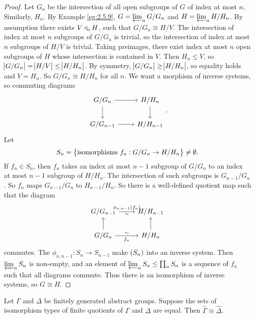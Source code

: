 \begin{proof}
Let $ G_n $ be the intersection of all open subgroups of $ G $ of index at most $ n $. Similarly, $ H_n $. By Example \ref{eg:2.5.9}, $ G = \varprojlim_n G / G_n $ and $ H = \varprojlim_n H / H_n $. By assumption there exists $ V \triangleleft_{\mathrm{o}} H $, such that $ G / G_n \cong H / V $. The intersection of index at most $ n $ subgroups of $ G / G_n $ is trivial, so the intersection of index at most $ n $ subgroups of $ H / V $ is trivial. Taking preimages, there exist index at most $ n $ open subgroups of $ H $ whose intersection is contained in $ V $. Then $ H_n \le V $, so $ \abs{G / G_n} = \abs{H / V} \le \abs{H / H_n} $. By symmetry, $ \abs{G / G_n} \ge \abs{H / H_n} $, so equality holds and $ V = H_n $. So $ G / G_n \cong H / H_n $ for all $ n $. We want a morphism of inverse systems, so commuting diagrams
$$
\begin{tikzcd}
G / G_n \arrow{r} \arrow{d} & H / H_n \arrow{d} \\
G / G_{n - 1} \arrow{r} & H / H_{n - 1}
\end{tikzcd}.
$$
Let
$$ S_n = \cbr{\text{isomorphisms} \ f_n : G / G_n \to H / H_n} \ne \emptyset. $$
If $ f_n \in S_n $, then $ f_n $ takes an index at most $ n - 1 $ subgroup of $ G / G_n $ to an index at most $ n - 1 $ subgroup of $ H / H_n $. The intersection of such subgroups is $ G_{n - 1} / G_n $. So $ f_n $ maps $ G_{n - 1} / G_n $ to $ H_{n - 1} / H_n $. So there is a well-defined quotient map such that the diagram
$$
\begin{tikzcd}
G / G_{n - 1} \arrow{r}{\phi_{n, n - 1}\br{f_n}}[swap]{\sim} & H / H_{n - 1} \\
G / G_n \arrow{r}{\sim}[swap]{f_n} \arrow{u} & H / H_n \arrow{u}
\end{tikzcd}
$$
commutes. The $ \phi_{n, n - 1} : S_n \to S_{n - 1} $ make $ \br{S_n} $ into an inverse system. Then $ \varprojlim_n S_n $ is non-empty, and an element of $ \varprojlim_n S_n \le \prod_n S_n $ is a sequence of $ f_n $ such that all diagrams commute. Thus there is an isomorphism of inverse systems, so $ G \cong H $.
\end{proof}

\begin{theorem}
Let $ \Gamma $ and $ \Delta $ be finitely generated abstract groups. Suppose the sets of isomorphism types of finite quotients of $ \Gamma $ and $ \Delta $ are equal. Then $ \widehat{\Gamma} \cong \widehat{\Delta} $.
\end{theorem}

